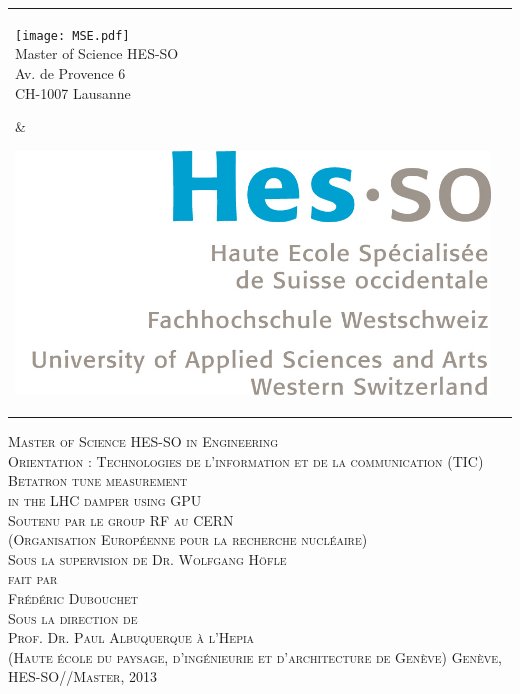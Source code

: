 
\begin{titlepage}

\begin{flushleft}
\begin{tabular}{lr}
    \parbox{8.5cm}{
    	\texttt{[image: MSE.pdf]}\\
    	\small Master of Science HES-SO\\
		\small Av. de Provence 6\\
		\small CH-1007 Lausanne
	} &
    \parbox{4cm}{
    	\includegraphics[scale=0.1]{HESSO.jpg}
    } \\[3cm]
\end{tabular}
\end{flushleft}

\begin{flushright}
\textsc{\Large Master of Science HES-SO in Engineering} \\[0.2cm]
\textsc{\small Orientation : Technologies de l’information et de la communication (TIC)}\\[1cm]
\textsc{\LARGE Betatron tune measurement \\[0.3cm] in the LHC damper using GPU} \\ [1cm]
\textsc{\small Soutenu par le group RF au CERN}\\ 
\textsc{\small (Organisation Europ{\'e}enne pour la recherche nucl{\'e}aire)}\\
\textsc{\small Sous la supervision de Dr. Wolfgang H{\"o}f\/le} \\[2cm]
\textsc{\small fait par} \\
\textsc{\Large Fr{\'e}d{\'e}ric Dubouchet} \\[2cm]
\textsc{\small Sous la direction de}\\
\textsc{\small Prof. Dr. Paul Albuquerque}
\textsc{\small {\`a} l'Hepia}\\
\textsc{\small (Haute {\'e}cole du paysage, d'ing{\'e}nieurie et d'architecture de Gen{\`e}ve)}
\vfill %
\textsc{\small Gen{\`e}ve, HES-SO//Master, 2013}
\end{flushright}

\end{titlepage}